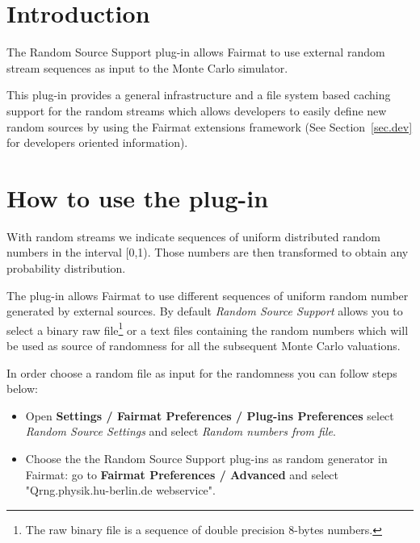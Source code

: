 \newcommand{\pluginName}{Random Sources Support}
\newcommand{\pluginVersion}{1.0}





\PluginTitle{\pluginName}{\pluginVersion}

\section{Introduction}

The Random Source Support plug-in allows Fairmat to use external random stream sequences as input to the Monte Carlo simulator.

This plug-in provides a general infrastructure and a file system based caching support for the random streams which allows developers to easily define new random sources by using the Fairmat extensions framework (See Section~\ref{sec.dev} for developers oriented information). 

\section{How to use the plug-in}

With random streams we indicate sequences of uniform distributed random numbers in the interval [0,1). Those numbers are then transformed to obtain any probability distribution.

The plug-in allows Fairmat to use different sequences of uniform random number generated by external sources. 
By default \emph{Random Source Support} allows you to select a binary raw file\footnote{The raw binary file is a sequence of double precision 8-bytes numbers.} or a text files containing the random numbers which will be used as source of randomness for all the subsequent Monte Carlo valuations.

In order choose a random file as input for the randomness you can follow steps below:

\begin{itemize}
\item Open \textbf{Settings / Fairmat Preferences / Plug-ins Preferences} select \emph{Random Source Settings} and select \emph{Random numbers from file}.
\item Choose the  the Random Source Support plug-ins as random generator in Fairmat: go to \textbf{Fairmat Preferences / Advanced} and select "Qrng.physik.hu-berlin.de webservice".
\end{itemize}

